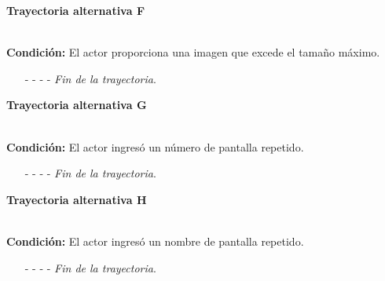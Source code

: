 \hypertarget{CU11-2:TAF}{\textbf{Trayectoria alternativa F}}\\
\noindent \textbf{Condición:} El actor proporciona una imagen que excede el tamaño máximo.
\begin{enumerate}
	\UCpaso[\UCsist] Muestra el mensaje  señalando el campo que presenta el error en la pantalla .
	\UCpaso Regresa al paso \ref{CU11.2-P6} de la trayectoria principal.
	\item[- -] - - {\em {Fin de la trayectoria}}.
\end{enumerate}

\hypertarget{CU11-2:TAG}{\textbf{Trayectoria alternativa G}}\\
\noindent \textbf{Condición:} El actor ingresó un número de pantalla repetido.
\begin{enumerate}
	\UCpaso[\UCsist] Muestra el mensaje  señalando el campo que presenta la duplicidad en la pantalla .
	\UCpaso Regresa al paso \ref{CU11.2-P5} de la trayectoria principal.
	\item[- -] - - {\em {Fin de la trayectoria}}.
\end{enumerate}
\hypertarget{CU11-2:TAH}{\textbf{Trayectoria alternativa H}}\\
\noindent \textbf{Condición:} El actor ingresó un nombre de pantalla repetido.
\begin{enumerate}
	\UCpaso[\UCsist] Muestra el mensaje  señalando el campo que presenta la duplicidad en la pantalla .
	\UCpaso Regresa al paso \ref{CU11.2-P5} de la trayectoria principal.
	\item[- -] - - {\em {Fin de la trayectoria}}.
\end{enumerate}